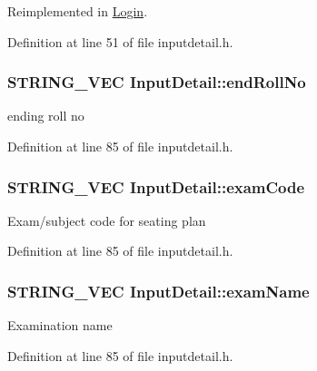 \-Reimplemented in \hyperlink{classLogin_abea56d6d6403f1e627294f222dd77310}{\-Login}.



\-Definition at line 51 of file inputdetail.\-h.

\hypertarget{classInputDetail_abc3249eab8fbf895620deff0a9349333}{
\subsubsection[{end\-Roll\-No}]{\setlength{\rightskip}{0pt plus 5cm}\-S\-T\-R\-I\-N\-G\-\_\-\-V\-E\-C {\bf \-Input\-Detail\-::end\-Roll\-No}}}\label{db/d6e/classInputDetail_abc3249eab8fbf895620deff0a9349333}
ending roll no 

\-Definition at line 85 of file inputdetail.\-h.

\hypertarget{classInputDetail_ac48c0170ce354d3cd188ddc2e83e2c67}{
\subsubsection[{exam\-Code}]{\setlength{\rightskip}{0pt plus 5cm}\-S\-T\-R\-I\-N\-G\-\_\-\-V\-E\-C {\bf \-Input\-Detail\-::exam\-Code}}}\label{db/d6e/classInputDetail_ac48c0170ce354d3cd188ddc2e83e2c67}
\-Exam/subject code for seating plan 

\-Definition at line 85 of file inputdetail.\-h.

\hypertarget{classInputDetail_a7b4e4a2a26f23da75d9928601a88a1d9}{
\subsubsection[{exam\-Name}]{\setlength{\rightskip}{0pt plus 5cm}\-S\-T\-R\-I\-N\-G\-\_\-\-V\-E\-C {\bf \-Input\-Detail\-::exam\-Name}}}\label{db/d6e/classInputDetail_a7b4e4a2a26f23da75d9928601a88a1d9}
\-Examination name 

\-Definition at line 85 of file inputdetail.\-h.

